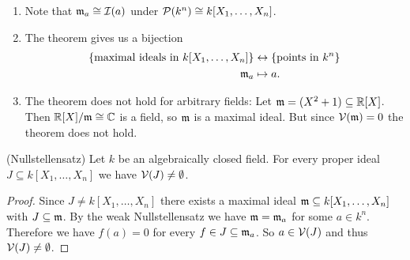 \begin{rem}
  \begin{enumerate}[label=\emph{\alph*)},leftmargin=*]
    \item
      Note that $\mathfrak{m}_{a} \cong \mathcal{I}(a)$ under $\mathcal{P}(k^n) \cong k[X_1, \dotsc, X_n]$.
    \item
      The theorem gives us a bijection
      \begin{align*}
                          \{\text{maximal ideals in $k[X_1, \dotsc, X_n]$}\}
        &\leftrightarrow  \{\text{points in $k^n$}\} \\
                          \mathfrak{m}_a
        &\mapsto          a.
      \end{align*}
    \item
      The theorem does not hold for arbitrary fields:
      Let \mbox{$\mathfrak{m} = (X^2 + 1) \subseteq \mathbb{R}[X]$}.
      Then $\mathbb{R}[X]/\mathfrak{m} \cong \mathbb{C}$ is a field, so $\mathfrak{m}$ is a maximal ideal.
      But since $\mathcal{V}(\mathfrak{m}) = 0$ the theorem does not hold.
  \end{enumerate}
\end{rem}


\begin{cor}(Nullstellensatz)
  Let $k$ be an algebraically closed field.
  For every proper ideal $J \subseteq k[X_1, \dotsc, X_n]$ we have $\mathcal{V}(J) \neq \emptyset$.
\end{cor}
\begin{proof}
  Since $J \neq k[X_1, \dotsc, X_n]$ there exists a maximal ideal $\mathfrak{m} \subseteq k[X_1, \dotsc, X_n]$ with $J \subseteq \mathfrak{m}$.
  By the weak Nullstellensatz we have $\mathfrak{m} = \mathfrak{m}_a$ for some $a \in k^n$.
  Therefore we have $f(a) = 0$ for every $f \in J \subseteq \mathfrak{m}_a$.
  So $a \in \mathcal{V}(J)$ and thus $\mathcal{V}(J) \neq \emptyset$.
\end{proof}


